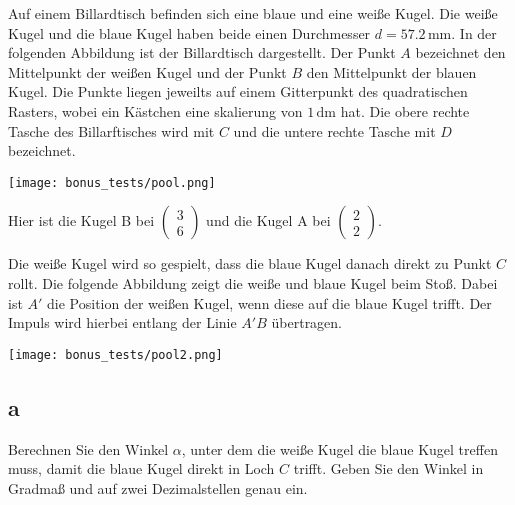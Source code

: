 Auf einem Billardtisch befinden sich eine blaue und eine weiße Kugel. Die weiße Kugel und die blaue Kugel haben beide einen Durchmesser \(d = 57.2\,\text{mm}\). In der folgenden Abbildung ist der Billardtisch dargestellt. Der Punkt \(A\) bezeichnet den Mittelpunkt der weißen Kugel und der Punkt \(B\) den Mittelpunkt der blauen Kugel. Die Punkte liegen jeweilts auf einem Gitterpunkt des quadratischen Rasters, wobei ein Kästchen eine skalierung von \(1\,\text{dm}\) hat. Die obere rechte Tasche des Billarftisches wird mit \(C\) und die untere rechte Tasche mit \(D\) bezeichnet.

\texttt{[image: bonus\_tests/pool.png]}

Hier ist die Kugel B bei \(\begin{pmatrix} 3 \\ 6 \end{pmatrix}\) und die Kugel A bei \(\begin{pmatrix} 2 \\ 2 \end{pmatrix}\).

Die weiße Kugel wird so gespielt, dass die blaue Kugel danach direkt zu Punkt \(C\) rollt. Die folgende Abbildung zeigt die weiße und blaue Kugel beim Stoß. Dabei ist \(A'\) die Position der weißen Kugel, wenn diese auf die blaue Kugel trifft. Der Impuls wird hierbei entlang der Linie \(A'B\) übertragen.

\texttt{[image: bonus\_tests/pool2.png]}

\subsection{a}

Berechnen Sie den Winkel \(\alpha\), unter dem die weiße Kugel die blaue Kugel treffen muss, damit die blaue Kugel direkt in Loch \(C\) trifft. Geben Sie den Winkel in Gradmaß und auf zwei Dezimalstellen genau ein.

